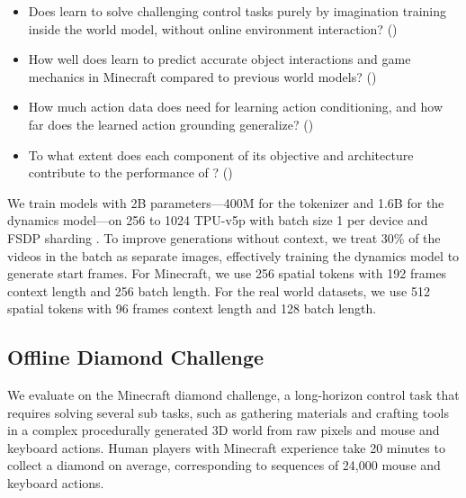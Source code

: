\documentclass[11pt]{article}
\begin{document}
\begin{itemize}
\item Does \method learn to solve challenging control tasks purely by imagination training inside the world model, without online environment interaction? ()
\item How well does \method learn to predict accurate object interactions and game mechanics in Minecraft compared to previous world models? ()
\item How much action data does \method need for learning action conditioning, and how far does the learned action grounding generalize? ()
\item To what extent does each component of its objective and architecture contribute to the performance of \method? ()
\end{itemize}

We train models with 2B parameters---400M for the tokenizer and 1.6B for the dynamics model---on 256 to 1024 TPU-v5p with batch size 1 per device and FSDP sharding \citep{fsdp,deepspeed}.
To improve generations without context, we treat 30\% of the videos in the batch as separate images, effectively training the dynamics model to generate start frames.
For Minecraft, we use 256 spatial tokens with 192 frames context length and 256 batch length.
For the real world datasets, we use 512 spatial tokens with 96 frames context length and 128 batch length.

\subsection{Offline Diamond Challenge}
\label{sec:control}



We evaluate \method on the Minecraft diamond challenge, a long-horizon control task that requires solving several sub tasks, such as gathering materials and crafting tools in a complex procedurally generated 3D world from raw pixels and mouse and keyboard actions.
Human players with Minecraft experience take 20 minutes to collect a diamond on average, corresponding to sequences of 24,000 mouse and keyboard actions.
\end{document}
